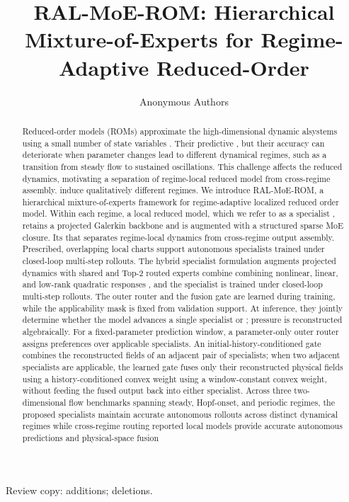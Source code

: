 \documentclass{article}
\title{RAL-MoE-ROM: Hierarchical Mixture-of-Experts for Regime-Adaptive Reduced-Order \DIFdelbegin \DIFdel{Model }\DIFdelend \DIFaddbegin \DIFadd{Modeling}\DIFaddend }
\author{Anonymous Authors}
\providecommand{\DIFaddtex}[1]{{\protect\color{blue} \sf #1}} %
\providecommand{\DIFdeltex}[1]{{\protect\color{red} \scriptsize #1}} %
\providecommand{\DIFaddbegin}{} %
\providecommand{\DIFaddend}{} %
\providecommand{\DIFdelbegin}{} %
\providecommand{\DIFdelend}{} %
\providecommand{\DIFadd}[1]{\texorpdfstring{\DIFaddtex{#1}}{#1}} %
\providecommand{\DIFdel}[1]{\texorpdfstring{\DIFdeltex{#1}}{}} %
\providecommand{\DIFscaledelfig}{0.5}
\newlength{\DIFdelgraphicswidth} %
\newlength{\DIFdelgraphicsheight} %
\providecommand{\DIFaddincludegraphics}[2][]{{\color{blue}\fbox{\DIFOincludegraphics[#1]{#2}}}} %
\providecommand{\DIFdelincludegraphics}[2][]{%
\sbox{\DIFdelgraphicsbox}{\DIFOincludegraphics[#1]{#2}}%
\settoboxwidth{\DIFdelgraphicswidth}{\DIFdelgraphicsbox} %
\settoboxtotalheight{\DIFdelgraphicsheight}{\DIFdelgraphicsbox} %
\scalebox{\DIFscaledelfig}{%
\parbox[b]{\DIFdelgraphicswidth}{\usebox{\DIFdelgraphicsbox}\\[-\baselineskip] \rule{\DIFdelgraphicswidth}{0em}}\llap{\resizebox{\DIFdelgraphicswidth}{\DIFdelgraphicsheight}{%
\setlength{\unitlength}{\DIFdelgraphicswidth}%
\begin{picture}(1,1)%
\thicklines\linethickness{2pt} %
{\color[rgb]{1,0,0}\put(0,0){\framebox(1,1){}}}%
{\color[rgb]{1,0,0}\put(0,0){\line( 1,1){1}}}%
{\color[rgb]{1,0,0}\put(0,1){\line(1,-1){1}}}%
\end{picture}%
}\hspace*{3pt}}} %
} %
\DeclareRobustCommand{\DIFaddbegin}{\DIFOaddbegin \let\includegraphics\DIFaddincludegraphics} %
\DeclareRobustCommand{\DIFaddend}{\DIFOaddend \let\includegraphics\DIFOincludegraphics} %
\DeclareRobustCommand{\DIFdelbegin}{\DIFOdelbegin \let\includegraphics\DIFdelincludegraphics} %
\DeclareRobustCommand{\DIFdelend}{\DIFOaddend \let\includegraphics\DIFOincludegraphics} %
\begin{document}
\raggedbottom

\maketitle
\begin{center}\small Review copy: {\color{blue}additions}; {\color{red}deletions}.\end{center}

\begin{abstract}
Reduced-order models (ROMs) approximate \DIFdelbegin \DIFdel{the }\DIFdelend high-dimensional dynamic\DIFaddbegin \DIFadd{al}\DIFaddend  systems using a small number of state variables\DIFdelbegin \DIFdel{.  Their predictive }\DIFdelend \DIFaddbegin \DIFadd{, but their }\DIFaddend accuracy can deteriorate when parameter changes \DIFdelbegin \DIFdel{lead to different dynamical regimes, such as a transition from steady flow to sustained oscillations. This challenge affects the reduced dynamics, motivating a separation of regime-local reduced model from cross-regime assembly.  }\DIFdelend \DIFaddbegin \DIFadd{induce qualitatively different regimes. }\DIFaddend We introduce RAL-MoE-ROM, a hierarchical mixture-of-experts framework \DIFdelbegin \DIFdel{for regime-adaptive  localized reduced order model. Within each regime, a local reduced model, which we refer to as a specialist , retains a projected Galerkin backbone and is augmented with a structured sparse MoE closure. Its }\DIFdelend \DIFaddbegin \DIFadd{that separates regime-local dynamics from cross-regime output assembly. Prescribed, overlapping local charts support autonomous specialists trained under closed-loop multi-step rollouts. The hybrid specialist formulation augments projected dynamics with }\DIFaddend shared and Top-2 routed experts \DIFdelbegin \DIFdel{combine }\DIFdelend \DIFaddbegin \DIFadd{combining }\DIFaddend nonlinear, linear, and low-rank quadratic responses\DIFdelbegin \DIFdel{, and the specialist is trained under closed-loop multi-step rollouts. The outer router and the fusion gate are learned during training, while the applicability mask is fixed from validation support. At inference, they jointly determine whether the model advances a single specialist or }\DIFdelend \DIFaddbegin \DIFadd{; pressure is reconstructed algebraically. For a fixed-parameter prediction window, a parameter-only outer router assigns preferences over applicable specialists. An initial-history-conditioned gate combines the reconstructed fields of }\DIFaddend an adjacent pair \DIFdelbegin \DIFdel{of specialists; when two adjacent specialists are applicable, the learned gate fuses only their reconstructed physical fields using a history-conditioned convex weight}\DIFdelend \DIFaddbegin \DIFadd{using a window-constant convex weight, without feeding the fused output back into either specialist}\DIFaddend . Across three \DIFaddbegin \DIFadd{two-dimensional }\DIFaddend flow benchmarks spanning steady, Hopf-onset, and periodic regimes, the \DIFdelbegin \DIFdel{proposed specialists maintain accurate autonomous rollouts across distinct dynamical regimes while cross-regime routing }\DIFdelend \DIFaddbegin \DIFadd{reported local models provide accurate autonomous predictions }\DIFaddend and physical-space fusion \DIFdelbegin 
\end{abstract}
\end{document}

